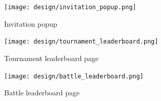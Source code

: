 \begin{figure} [H]
    \begin{center}
        \texttt{[image: design/invitation\_popup.png]}
        \caption{Invitation popup}
        \label{fig: invitation_popup}
    \end{center}
\end{figure}

\begin{figure} [H]
    \begin{center}
        \texttt{[image: design/tournament\_leaderboard.png]}
        \caption{Tournament leaderboard page}
        \label{fig: tournament_leaderboard}
    \end{center}
\end{figure}

\begin{figure} [H]
    \begin{center}
        \texttt{[image: design/battle\_leaderboard.png]}
        \caption{Battle leaderboard page}
        \label{fig: battle_leaderboard}
    \end{center}
\end{figure}